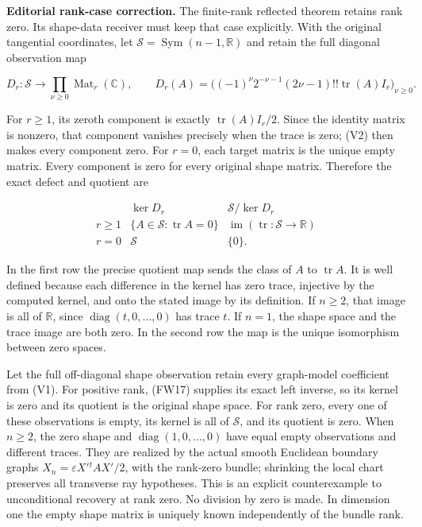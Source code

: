 \documentclass[
  11pt,
]{article}
\begin{document}
\textbf{Editorial rank-case correction.} The finite-rank reflected
theorem retains rank zero. Its shape-data receiver must keep that case
explicitly. With the original tangential coordinates, let
\(\mathcal S=\operatorname{Sym}(n-1,\mathbb R)\) and retain the full
diagonal observation map

\[
 D_r:\mathcal S\longrightarrow\prod_{\nu\geq0}\operatorname{Mat}_r(\mathbb C),
 \qquad D_r(A)=\bigl((-1)^\nu2^{-\nu-1}(2\nu-1)!!
                 \operatorname{tr}(A)I_r\bigr)_{\nu\geq0}.
 \tag{RZ1}
\]

For \(r\geq1\), its zeroth component is exactly
\(\operatorname{tr}(A)I_r/2\). Since the identity matrix is nonzero,
that component vanishes precisely when the trace is zero; (V2) then
makes every component zero. For \(r=0\), each target matrix is the
unique empty matrix. Every component is zero for every original shape
matrix. Therefore the exact defect and quotient are

\[
 \begin{array}{c|c|c}
 &\ker D_r&\mathcal S/\ker D_r\\
 r\geq1&\{A\in\mathcal S:\operatorname{tr}A=0\}
       &\operatorname{im}(\operatorname{tr}:\mathcal S\to\mathbb R)\\
 r=0&\mathcal S&\{0\}.
 \end{array}\tag{RZ2}
\]

In the first row the precise quotient map sends the class of \(A\) to
\(\operatorname{tr}A\). It is well defined because each difference in
the kernel has zero trace, injective by the computed kernel, and onto
the stated image by its definition. If \(n\geq2\), that image is all of
\(\mathbb R\), since \(\operatorname{diag}(t,0,\ldots,0)\) has trace
\(t\). If \(n=1\), the shape space and the trace image are both zero. In
the second row the map is the unique isomorphism between zero spaces.

Let the full off-diagonal shape observation retain every graph-model
coefficient from (V1). For positive rank, (FW17) supplies its exact left
inverse, so its kernel is zero and its quotient is the original shape
space. For rank zero, every one of these observations is empty, its
kernel is all of \(\mathcal S\), and its quotient is zero. When
\(n\geq2\), the zero shape and \(\operatorname{diag}(1,0,\ldots,0)\)
have equal empty observations and different traces. They are realized by
the actual smooth Euclidean boundary graphs
\(X_n=\varepsilon X'{}^tAX'/2\), with the rank-zero bundle; shrinking
the local chart preserves all transverse ray hypotheses. This is an
explicit counterexample to unconditional recovery at rank zero. No
division by zero is made. In dimension one the empty shape matrix is
uniquely known independently of the bundle rank.
\end{document}
